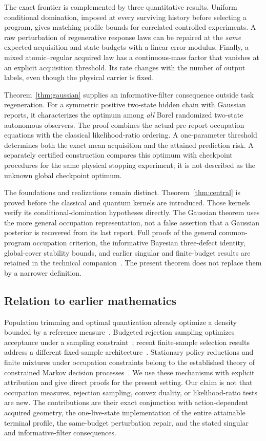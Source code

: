 The exact frontier is complemented by three quantitative results. Uniform conditional domination, imposed at every surviving history before selecting a program, gives matching profile bounds for correlated controlled experiments. A raw perturbation of regenerative response laws can be repaired at the \emph{same} expected acquisition and state budgets with a linear error modulus. Finally, a mixed atomic--regular acquired law has a continuous-mass factor that vanishes at an explicit acquisition threshold. Its rate changes with the number of output labels, even though the physical carrier is fixed.

Theorem~\ref{thm:gaussian} supplies an informative-filter consequence outside task regeneration. For a symmetric positive two-state hidden chain with Gaussian reports, it characterizes the optimum among \emph{all} Borel randomized two-state autonomous observers. The proof combines the actual pre-report occupation equations with the classical likelihood-ratio ordering. A one-parameter threshold determines both the exact mean acquisition and the attained prediction risk. A separately certified construction compares this optimum with checkpoint procedures for the same physical stopping experiment; it is not described as the unknown global checkpoint optimum.

The foundations and realizations remain distinct. Theorem~\ref{thm:central} is proved before the classical and quantum kernels are introduced. Those kernels verify its conditional-domination hypotheses directly. The Gaussian theorem uses the more general occupation representation, not a false assertion that a Gaussian posterior is recovered from its last report. Full proofs of the general common-program occupation criterion, the informative Bayesian three-defect identity, global-cover stability bounds, and earlier singular and finite-budget results are retained in the technical companion~\cite{GTF49,GTF32}. The present theorem does not replace them by a narrower definition.

\subsection*{Relation to earlier mathematics}
Population trimming and optimal quantization already optimize a density bounded by a reference measure~\cite{CGM}. Budgeted rejection sampling optimizes acceptance under a sampling constraint~\cite{Verine}; recent finite-sample selection results address a different fixed-sample architecture~\cite{UR}. Stationary policy reductions and finite mixtures under occupation constraints belong to the established theory of constrained Markov decision processes~\cite{DPR,DPRchat}. We use these mechanisms with explicit attribution and give direct proofs for the present setting. Our claim is not that occupation measures, rejection sampling, convex duality, or likelihood-ratio tests are new. The contributions are their exact conjunction with action-dependent acquired geometry, the one-live-state implementation of the entire attainable terminal profile, the same-budget perturbation repair, and the stated singular and informative-filter consequences.

